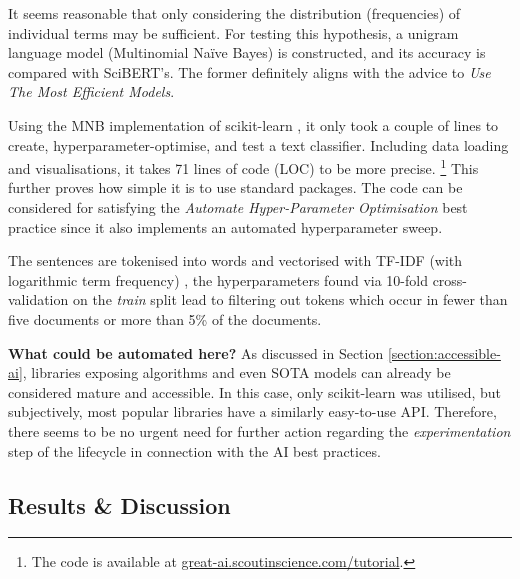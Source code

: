 It seems reasonable that only considering the distribution (frequencies) of individual terms may be sufficient. For testing this hypothesis, a unigram language model (Multinomial Naïve Bayes) is constructed, and its accuracy is compared with SciBERT's. The former definitely aligns with the advice to \textit{Use The Most Efficient Models}.

Using the MNB implementation of scikit-learn \cite{pedregosa2011scikit}, it only took a couple of lines to create, hyperparameter-optimise, and test a text classifier. Including data loading and visualisations, it takes 71 lines of code (LOC) to be more precise. \footnote{The code is available at \href{https://great-ai.scoutinscience.com/tutorial/}{great-ai.scoutinscience.com/tutorial}.} This further proves how simple it is to use standard packages. The code can be considered for satisfying the \textit{Automate Hyper-Parameter Optimisation} best practice since it also implements an automated hyperparameter sweep. 

The sentences are tokenised into words and vectorised with TF-IDF (with logarithmic term frequency) \cite{buckley1985implementation}, the hyperparameters found via 10-fold cross-validation on the \textit{train} split lead to filtering out tokens which occur in fewer than five documents or more than 5\% of the documents.

\begin{displayquote}
\textbf{What could be automated here?} As discussed in Section \ref{section:accessible-ai}, libraries exposing algorithms and even SOTA models can already be considered mature and accessible. In this case, only scikit-learn was utilised, but subjectively, most popular libraries have a similarly easy-to-use API. Therefore, there seems to be no urgent need for further action regarding the \textit{experimentation} step of the lifecycle in connection with the AI best practices.
\end{displayquote}

\subsection{Results \& Discussion}

